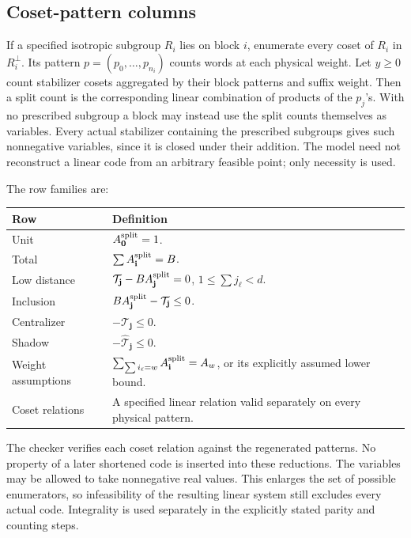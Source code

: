 \subsection{Coset-pattern columns}

If a specified isotropic subgroup \(R_i\) lies on block \(i\), enumerate
every coset of \(R_i\) in \(R_i^\perp\). Its pattern
\(p=(p_0,\ldots,p_{n_i})\) counts words at each physical weight.
Let \(y\geq0\) count stabilizer cosets aggregated by their block
patterns and suffix weight. Then a split count is the corresponding
linear combination of products of the \(p_j\)'s.
With no prescribed subgroup a block may instead use the split counts
themselves as variables. Every actual stabilizer containing the prescribed
subgroups gives such nonnegative variables, since it is closed under their
addition. The model need not reconstruct a linear code from an arbitrary
feasible point; only necessity is used.

The row families are:
\begin{center}\small
\begin{tabularx}{\linewidth}{@{}lX@{}}\toprule
Row&Definition\\\midrule
Unit&\(A^{\rm split}_{\mathbf0}=1\).\\
Total&\(\sum A^{\rm split}_{\mathbf i}=B\).\\
Low distance&\(\mathcal T_{\mathbf j}-BA^{\rm split}_{\mathbf j}=0\), \(1\leq\sum j_\ell<d\).\\
Inclusion&\(BA^{\rm split}_{\mathbf j}-\mathcal T_{\mathbf j}\leq0\).\\
Centralizer&\(-\mathcal T_{\mathbf j}\leq0\).\\
Shadow&\(-\widehat{\mathcal T}_{\mathbf j}\leq0\).\\
Weight assumptions&\(\sum_{\sum i_\ell=w}A^{\rm split}_{\mathbf i}=A_w\), or its explicitly assumed lower bound.\\
Coset relations&A specified linear relation valid separately on every physical pattern.\\\bottomrule
\end{tabularx}
\end{center}
The checker verifies each coset relation against the regenerated patterns.
No property of a later shortened code is inserted into these reductions.
The variables may be allowed to take nonnegative real values. This
enlarges the set of possible enumerators, so infeasibility of the
resulting linear system still excludes every actual code. Integrality
is used separately in the explicitly stated parity and counting steps.


